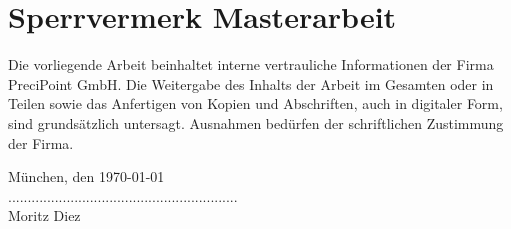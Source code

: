 \section*{Sperrvermerk Masterarbeit}

Die vorliegende Arbeit beinhaltet interne vertrauliche Informationen der Firma PreciPoint GmbH. Die Weitergabe des Inhalts der Arbeit im Gesamten oder in Teilen sowie das Anfertigen von Kopien und Abschriften, auch in digitaler Form, sind grundsätzlich untersagt. Ausnahmen bedürfen der schriftlichen Zustimmung der Firma.

\vspace{2cm}

München, den \today \\[2cm]
...........................................................\\
Moritz Diez